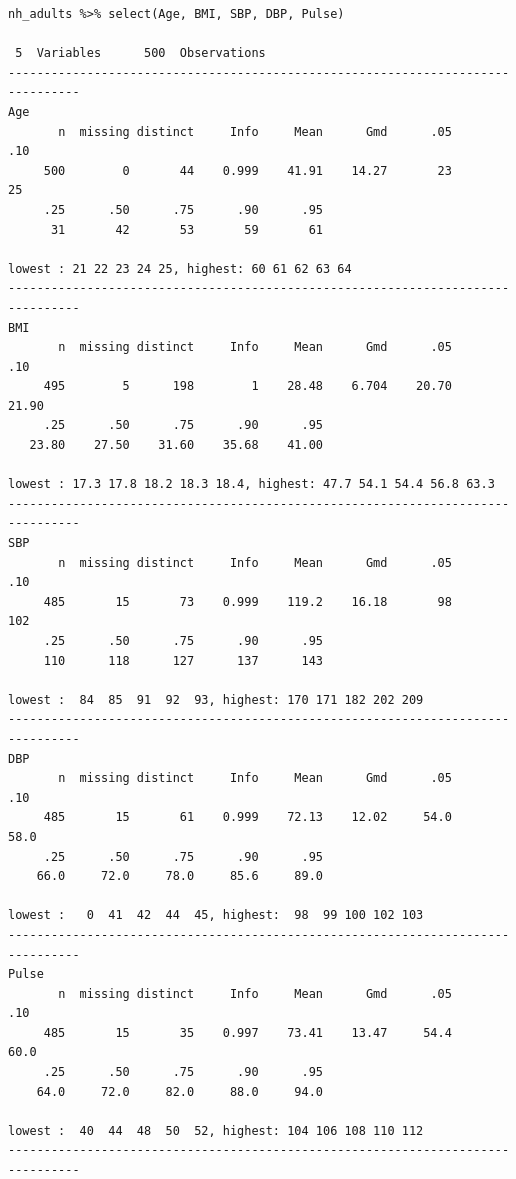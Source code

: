 \documentclass[
]{book}
\newenvironment{Shaded}{\begin{snugshade}}{\end{snugshade}}
\newcommand{\KeywordTok}[1]{\textcolor[rgb]{0.13,0.29,0.53}{\textbf{#1}}}
\newcommand{\NormalTok}[1]{#1}
\newcommand{\OperatorTok}[1]{\textcolor[rgb]{0.81,0.36,0.00}{\textbf{#1}}}
\newcommand{\StringTok}[1]{\textcolor[rgb]{0.31,0.60,0.02}{#1}}
\begin{document}
\begin{Shaded}
\end{Shaded}

\begin{verbatim}
nh_adults %>% select(Age, BMI, SBP, DBP, Pulse) 

 5  Variables      500  Observations
--------------------------------------------------------------------------------
Age 
       n  missing distinct     Info     Mean      Gmd      .05      .10 
     500        0       44    0.999    41.91    14.27       23       25 
     .25      .50      .75      .90      .95 
      31       42       53       59       61 

lowest : 21 22 23 24 25, highest: 60 61 62 63 64
--------------------------------------------------------------------------------
BMI 
       n  missing distinct     Info     Mean      Gmd      .05      .10 
     495        5      198        1    28.48    6.704    20.70    21.90 
     .25      .50      .75      .90      .95 
   23.80    27.50    31.60    35.68    41.00 

lowest : 17.3 17.8 18.2 18.3 18.4, highest: 47.7 54.1 54.4 56.8 63.3
--------------------------------------------------------------------------------
SBP 
       n  missing distinct     Info     Mean      Gmd      .05      .10 
     485       15       73    0.999    119.2    16.18       98      102 
     .25      .50      .75      .90      .95 
     110      118      127      137      143 

lowest :  84  85  91  92  93, highest: 170 171 182 202 209
--------------------------------------------------------------------------------
DBP 
       n  missing distinct     Info     Mean      Gmd      .05      .10 
     485       15       61    0.999    72.13    12.02     54.0     58.0 
     .25      .50      .75      .90      .95 
    66.0     72.0     78.0     85.6     89.0 

lowest :   0  41  42  44  45, highest:  98  99 100 102 103
--------------------------------------------------------------------------------
Pulse 
       n  missing distinct     Info     Mean      Gmd      .05      .10 
     485       15       35    0.997    73.41    13.47     54.4     60.0 
     .25      .50      .75      .90      .95 
    64.0     72.0     82.0     88.0     94.0 

lowest :  40  44  48  50  52, highest: 104 106 108 110 112
--------------------------------------------------------------------------------
\end{verbatim}
\end{document}
